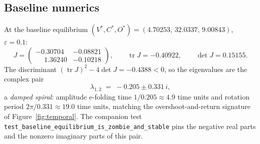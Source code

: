 \subsection{Baseline numerics}

At the baseline equilibrium
$(V^{*},C^{*},O^{*})=(4.70253,\,32.0337,\,9.00843)$, $\varepsilon=0.1$:
\[
J=
\begin{pmatrix}
-0.30704 & -0.08821\\
\phantom{-}1.36240 & -0.10218
\end{pmatrix},
\qquad
\operatorname{tr}J=-0.40922,\qquad
\det J=0.15155 .
\]
The discriminant $(\operatorname{tr}J)^{2}-4\det J=-0.4388<0$, so the
eigenvalues are the complex pair
\[
\lambda_{1,2} \;=\; -0.205\pm0.331\,i ,
\]
a \emph{damped spiral}: amplitude e-folding time
$1/0.205\approx4.9$ time units and rotation period
$2\pi/0.331\approx19.0$ time units, matching the overshoot-and-return
signature of Figure~\ref{fig:temporal}. The companion test
\texttt{test\_baseline\_equilibrium\_is\_zombie\_and\_stable} pins the
negative real parts and the nonzero imaginary parts of this pair.
